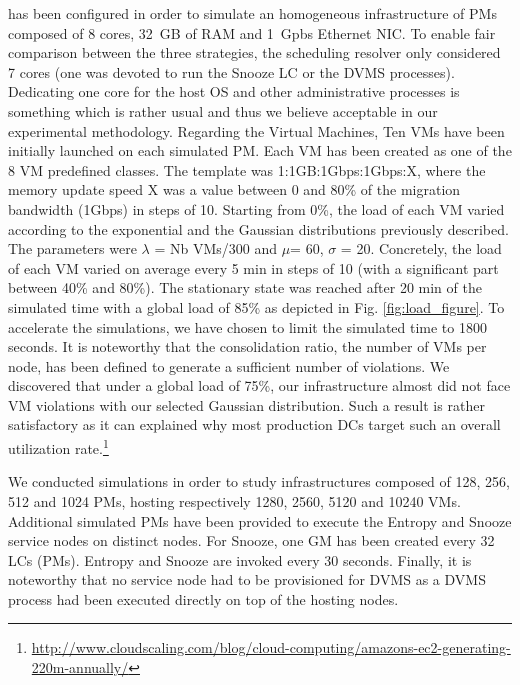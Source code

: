 \vmps has been configured in order to simulate an homogeneous
infrastructure of PMs composed of 8 cores, 32~GB of RAM and 1~Gpbs
Ethernet NIC. To enable fair comparison between the three strategies,
the scheduling resolver only considered 7 cores (\ie one was devoted
to run the Snooze LC or the DVMS processes). Dedicating one core for
the host OS and other administrative processes is something which is
rather usual and thus we believe acceptable in our experimental
methodology. Regarding the Virtual Machines, Ten VMs have been
initially launched on each simulated PM.
 Each VM has been created as one of the 8 VM predefined classes. The
template was 1:1GB:1Gbps:1Gbps:X, where the memory update speed X was a value between 0 and 80\% of the migration bandwidth (1Gbps) in steps
of 10. Starting from 0\%, the load of each VM varied according to the
 exponential and the Gaussian distributions previously described. The
 parameters were $\lambda$ = Nb VMs/300 and $\mu$= 60, $\sigma$ = 20.
 Concretely, the load of each VM varied on average every 5 min in
 steps of 10 (with a significant part between 40\% and 80\%). The stationary state was
reached after 20 min of the simulated time with a global load of 85\%
as depicted in Fig. \ref{fig:load_figure}. To accelerate the
simulations, we have chosen to limit the simulated time to 1800
seconds. It is noteworthy that the consolidation ratio, \ie the number
of VMs per node, has been defined to generate a sufficient number of
violations. We discovered that under a global load of 75\%, our
infrastructure almost did not face VM violations with our selected Gaussian
distribution. Such a result is rather
satisfactory as it can explained why most production DCs target such
an overall utilization rate.\footnote{\url{http://www.cloudscaling.com/blog/cloud-computing/amazons-ec2-generating-220m-annually/}}

We conducted simulations in order to study infrastructures composed of
128, 256, 512 and 1024 PMs,
hosting respectively 1280, 2560, 5120 and
10240 VMs. Additional simulated PMs have been provided to execute the
Entropy and Snooze service nodes on distinct nodes. For Snooze, one GM
has been created every 32 LCs (\ie PMs). Entropy and Snooze are
invoked every 30 seconds. Finally, it is noteworthy that no service
node had to be provisioned for DVMS as a DVMS process had been
executed directly on top of the hosting nodes.

